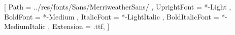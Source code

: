 \setsansfont{MerriweatherSans}
[
	Path = ../res/fonts/Sans/MerriweatherSans/ ,
	UprightFont = *-Light ,
	BoldFont = *-Medium ,
	ItalicFont = *-LightItalic ,
	BoldItalicFont = *-MediumItalic ,
	Extension = .ttf,
]